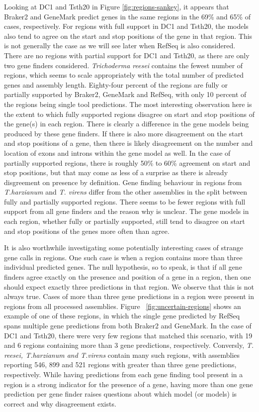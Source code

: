 Looking at DC1 and Tsth20 in Figure \ref{fig:regions-sankey}, it
appears that Braker2 and GeneMark predict genes in the same regions in
the 69\% and 65\% of cases, respectively. For regions with full
support in DC1 and Tsth20, the models also tend to agree on the start
and stop positions of the gene in that region. This is not generally
the case as we will see later when RefSeq is also considered. There
are no regions with partial support for DC1 and Tsth20, as there are
only two gene finders considered. \textit{Trichoderma reesei} contains
the fewest number of regions, which seems to scale appropriately with
the total number of predicted genes and assembly length. Eighty-four
percent of the regions are fully or partially supported by Braker2,
GeneMark and RefSeq, with only 10 percent of the regions being single
tool predictions. The most interesting observation here is the extent
to which fully supported regions disagree on start and stop positions
of the gene(s) in each region. There is clearly a difference in the
gene models being produced by these gene finders. If there is also
more disagreement on the start and stop positions of a gene, then
there is likely disagreement on the number and location of exons and
introns within the gene model as well. In the case of partially
supported regions, there is roughly 50\% to 60\% agreement on start
and stop positions, but that may come as less of a surprise as there
is already disgreement on presence by definition. Gene finding
behaviour in regions from \textit{T.harzianum} and \textit{T. virens}
differ from the other assemblies in the split between fully and
partially supported regions. There seems to be fewer regions with full
support from all gene finders and the reason why is unclear. The gene
models in each region, whether fully or partially supported, still
tend to disagree on start and stop positions of the genes more often
than agree.

It is also worthwhile investigating some potentially interesting cases
of strange gene calls in regions. One such case is when a region
contains more than three individual predicted genes. The null
hypothesis, so to speak, is that if all gene finders agree exactly on
the presence and position of a gene in a region, then one should
expect exactly three predictions in that region. We observe that this
is not always true. Cases of more than three gene predictions in a
region were present in regions from all processed assemblies. Figure
~\ref{fig:uncertain-regions} shows an example of one of these regions,
in which the single gene predicted by RefSeq spans multiple gene
predictions from both Braker2 and GeneMark. In the case of DC1 and
Tsth20, there were very few regions that matched this scenario, with
19 and 6 regions containing more than 3 gene predictions,
respectively. Conversly, \textit{T. reesei, T.harzianum and T.virens}
contain many such regions, with assemblies reporting 546, 899 and 521
regions with greater than three gene predictions, respectively. While
having predictions from each gene finding tool present in a region is
a strong indicator for the presence of a gene, having more than one
gene prediction per gene finder raises questions about which model (or
models) is correct and why disagreement exists.

